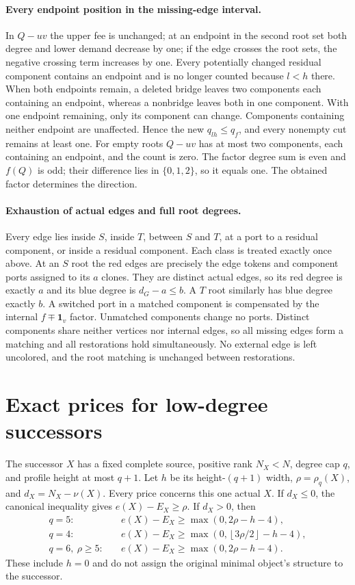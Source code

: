 \documentclass[11pt,a4paper]{article}
\newcommand{\floor}[1]{\left\lfloor#1\right\rfloor}
\theoremstyle{definition}
\begin{document}
\paragraph{Every endpoint position in the missing-edge interval.}
In $Q-uv$ the upper fee is unchanged; at an endpoint in the second root set both degree and lower demand decrease by one; if the edge crosses the root sets, the negative crossing term increases by one. Every potentially changed residual component contains an endpoint and is no longer counted because $l<h$ there. When both endpoints remain, a deleted bridge leaves two components each containing an endpoint, whereas a nonbridge leaves both in one component. With one endpoint remaining, only its component can change. Components containing neither endpoint are unaffected. Hence the new $q_{lh}\le q_f$, and every nonempty cut remains at least one. For empty roots $Q-uv$ has at most two components, each containing an endpoint, and the count is zero. The factor degree sum is even and $f(Q)$ is odd; their difference lies in $\{0,1,2\}$, so it equals one. The obtained factor determines the direction.

\paragraph{Exhaustion of actual edges and full root degrees.}
Every edge lies inside $S$, inside $T$, between $S$ and $T$, at a port to a residual component, or inside a residual component. Each class is treated exactly once above. At an $S$ root the red edges are precisely the edge tokens and component ports assigned to its $a$ clones. They are distinct actual edges, so its red degree is exactly $a$ and its blue degree is $d_G-a\le b$. A $T$ root similarly has blue degree exactly $b$. A switched port in a matched component is compensated by the internal $f\mp\mathbf1_v$ factor. Unmatched components change no ports. Distinct components share neither vertices nor internal edges, so all missing edges form a matching and all restorations hold simultaneously. No external edge is left uncolored, and the root matching is unchanged between restorations.

\section{Exact prices for low-degree successors}\label{app:small-prices}
The successor $X$ has a fixed complete source, positive rank $N_X<N$, degree cap $q$, and profile height at most $q+1$. Let $h$ be its height-$(q+1)$ width, $\rho=\rho_q(X)$, and $d_X=N_X-\nu(X)$. Every price concerns this one actual $X$. If $d_X\le0$, the canonical inequality gives $e(X)-E_X\ge\rho$. If $d_X>0$, then
\begin{align}
q=5:\quad&e(X)-E_X\ge\max(0,2\rho-h-4),\label{eq:price5}\\
q=4:\quad&e(X)-E_X\ge\max(0,\floor{3\rho/2}-h-4),\label{eq:price4}\\
q=6,\ \rho\ge5:\quad&e(X)-E_X\ge\max(0,2\rho-h-4).\label{eq:price6}
\end{align}
These include $h=0$ and do not assign the original minimal object's structure to the successor.
\end{document}
